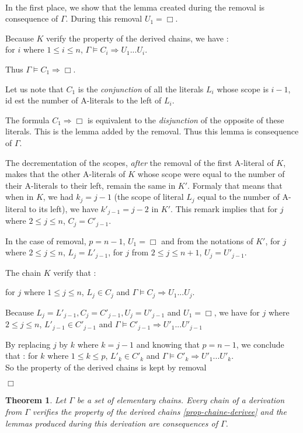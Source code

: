 \documentclass{article}
\newtheorem{theoreme}{Theorem}\newtheorem{lemme}[theoreme]{Lemma}
\newenvironment{preuve}{\noindent {\em Proof :}\ }{{\hfill
    $\Box$}\vspace{.5pc}} \newcommand{\sg}{\!\!<\!\!}
\begin{document}
\begin{preuve}
\begin{itemrond}
In the first place, we show that the lemma created during the removal is consequence of $\Gamma$.
During this removal $U_1 = \Box$.

Because $K$ verify the property of the derived chains, we have : \\for $i$ where $1 \leq i \leq n$, 
$\Gamma \models C_i \Rightarrow U_1...U_i$.

Thus $\Gamma \models C_1 \Rightarrow \Box$. 

Let us note that $C_1$ is the \emph{conjunction}  of all the literals $L_i$ whose scope is $i-1$, id est the
number of A-literals to the left of $L_i$.

The formula $C_1 \Rightarrow \Box$ is equivalent to the \emph{disjunction} of the opposite of these literals.
This is the lemma added by the removal. Thus this lemma is consequence of $\Gamma$.

The decrementation of the scopes, \emph{after} the removal of the first A-literal of $K$, makes that the other A-literals of $K$ 
whose scope were equal to the number of their A-literals to their left, remain the same in $K'$. 
Formaly that means that when in $K$, we had $k_j = j-1$ (the scope of literal $L_j$ equal to the number of A-literal to its left), 
we have $k'_{j-1} = j-2$ in $K'$. This remark implies that  for $j$ where $2 \leq j \leq n$, $C_j = C'_{j-1}$.
 
In the case of removal, $p = n-1$, $U_1 = \Box$ and from the notations of $K'$, 
for $j$ where $2 \leq j \leq n$, $L_j = L'_{j-1}$, for $j$ from $2 \leq j \leq n+1$, $U_j = U'_{j-1}$. 

The chain $K$ verify that : 

for $j$ where $1 \leq j \leq n$, $L_j \in C_j$ and $\Gamma \models C_j \Rightarrow U_1...U_j$.

Because $L_j = L'_{j-1}, C_j = C'_{j-1}, U_j = U'_{j-1}$ and $U_1 = \Box$, we have 
for $j$ where $2 \leq j \leq n$, $L'_{j-1} \in C'_{j-1}$ and $\Gamma \models C'_{j-1} \Rightarrow U'_1...U'_{j-1}$

By replacing $j$ by $k$ where $k = j-1$ and knowing that $p = n-1$, we conclude that :
for $k$ where $1 \leq k \leq p$, $L'_k \in C'_k$ and $\Gamma \models C'_k \Rightarrow U'_1...U'_k$.\\
So the property of the derived chains is kept by removal
\end{itemrond}
\end{preuve}


\begin{theoreme}
Let $\Gamma$ be a set of elementary chains. Every chain of a derivation from $\Gamma$ verifies the property of the derived chains
\ref{prop-chaine-derivee} and the lemmas produced during this derivation are consequences of $\Gamma$.
\end{theoreme}
\end{document}
